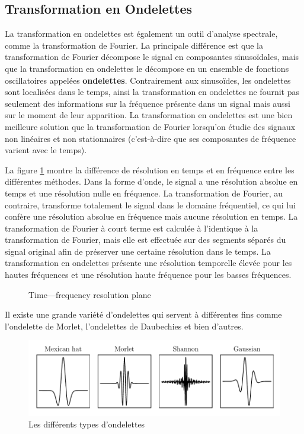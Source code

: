 \subsection{Transformation en Ondelettes}
La transformation en ondelettes est également un outil d'analyse spectrale, comme la transformation de Fourier. La principale différence est que la transformation de Fourier décompose le signal en composantes sinusoïdales, mais que la transformation en ondelettes le décompose en un ensemble de fonctions oscillatoires appelées \textbf{ondelettes}. Contrairement aux sinusoïdes, les ondelettes sont localisées dans le temps, ainsi la transformation en ondelettes ne fournit pas seulement des informations sur la fréquence présente dans un signal mais aussi sur le moment de leur apparition. La transformation en ondelettes est une bien meilleure solution que la transformation de Fourier lorsqu'on étudie des signaux non linéaires et non stationnaires (c'est-à-dire que ses composantes de fréquence varient avec le temps).

La figure \ref{fig:time-frequency-plane} montre la différence de résolution en temps et en fréquence entre les différentes méthodes. Dans la forme d'onde, le signal a une résolution absolue en temps et une résolution nulle en fréquence. La transformation de Fourier, au contraire, transforme totalement le signal dans le domaine fréquentiel, ce qui lui confère une résolution absolue en fréquence mais aucune résolution en temps. La transformation de Fourier à court terme est calculée à l'identique à la transformation de Fourier, mais elle est effectuée sur des segments séparés du signal original afin de préserver une certaine résolution dans le temps. La transformation en ondelettes présente une résolution temporelle élevée pour les hautes fréquences et une résolution haute fréquence pour les basses fréquences.

\begin{figure}[H]
    \centering
    
    \caption{Time—frequency resolution plane}
    \label{fig:time-frequency-plane}
\end{figure}

Il existe une grande variété d'ondelettes qui servent à différentes fins comme l'ondelette de Morlet, l'ondelettes de Daubechies et bien d'autres.

\begin{figure}[H]
    \centering
    \includegraphics{figures/wavelets.pdf}
    \caption{Les différents types d'ondelettes}
    \label{fig:wavelets}
\end{figure}

